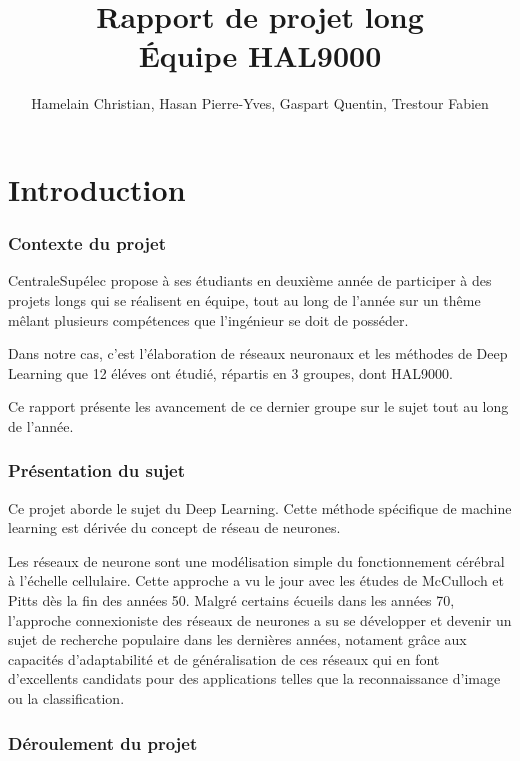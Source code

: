 \documentclass[a4paper,twoside]{report}
\title{Rapport de projet long\\Équipe HAL9000}
\author{Hamelain Christian, Hasan Pierre-Yves, Gaspart Quentin, Trestour Fabien}
\begin{document}
	\maketitle


	\tableofcontents


	\part{Introduction}

		\section[Contexte]{Contexte du projet}

			CentraleSupélec propose à ses étudiants en deuxième année de participer à des projets longs qui se réalisent en équipe, tout au long de l'année sur un thême mêlant plusieurs compétences que l'ingénieur se doit de posséder.

			Dans notre cas, c'est l'élaboration de réseaux neuronaux et les méthodes de Deep Learning que 12 éléves ont étudié, répartis en 3 groupes, dont HAL9000.

			Ce rapport présente les avancement de ce dernier groupe sur le sujet tout au long de l'année.


		\section{Présentation du sujet}

			Ce projet aborde le sujet du Deep Learning. Cette méthode spécifique de machine learning est dérivée du concept de réseau de neurones.

			Les réseaux de neurone sont une modélisation simple du fonctionnement cérébral à l'échelle cellulaire. Cette approche a vu le jour avec les études de McCulloch et Pitts dès la fin des années 50. Malgré certains écueils dans les années 70, l'approche connexioniste des réseaux de neurones a su se développer et devenir un sujet de recherche populaire dans les dernières années, notament grâce aux capacités d'adaptabilité et de généralisation de ces réseaux qui en font d'excellents candidats pour des applications telles que la reconnaissance d'image ou la classification.


		\section[Déroulement]{Déroulement du projet}
\end{document}
